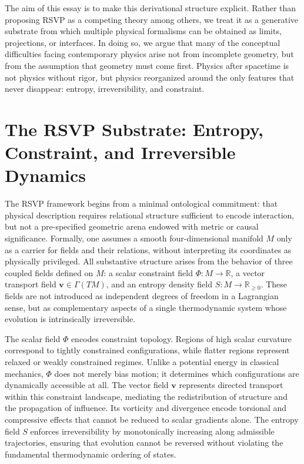 \documentclass[11pt]{article}
\begin{document}
The aim of this essay is to make this derivational structure explicit. Rather than proposing RSVP as a competing theory among others, we treat it as a generative substrate from which multiple physical formalisms can be obtained as limits, projections, or interfaces. In doing so, we argue that many of the conceptual difficulties facing contemporary physics arise not from incomplete geometry, but from the assumption that geometry must come first. Physics after spacetime is not physics without rigor, but physics reorganized around the only features that never disappear: entropy, irreversibility, and constraint.

\section{The RSVP Substrate: Entropy, Constraint, and Irreversible Dynamics}

The RSVP framework begins from a minimal ontological commitment: that physical description requires relational structure sufficient to encode interaction, but not a pre-specified geometric arena endowed with metric or causal significance. Formally, one assumes a smooth four-dimensional manifold $M$ only as a carrier for fields and their relations, without interpreting its coordinates as physically privileged. All substantive structure arises from the behavior of three coupled fields defined on $M$: a scalar constraint field $\Phi : M \to \mathbb{R}$, a vector transport field $\mathbf{v} \in \Gamma(TM)$, and an entropy density field $S : M \to \mathbb{R}_{\ge 0}$. These fields are not introduced as independent degrees of freedom in a Lagrangian sense, but as complementary aspects of a single thermodynamic system whose evolution is intrinsically irreversible.

The scalar field $\Phi$ encodes constraint topology. Regions of high scalar curvature correspond to tightly constrained configurations, while flatter regions represent relaxed or weakly constrained regimes. Unlike a potential energy in classical mechanics, $\Phi$ does not merely bias motion; it determines which configurations are dynamically accessible at all. The vector field $\mathbf{v}$ represents directed transport within this constraint landscape, mediating the redistribution of structure and the propagation of influence. Its vorticity and divergence encode torsional and compressive effects that cannot be reduced to scalar gradients alone. The entropy field $S$ enforces irreversibility by monotonically increasing along admissible trajectories, ensuring that evolution cannot be reversed without violating the fundamental thermodynamic ordering of states.
\end{document}
